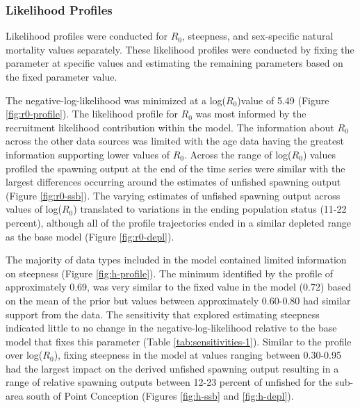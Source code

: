 \documentclass[11pt,
  english,
  letterpaper,
]{article}
\begin{document}
\hypertarget{likelihood-profiles}{%
\subsubsection{Likelihood Profiles}\label{likelihood-profiles}}

Likelihood profiles were conducted for \(R_0\), steepness, and sex-specific natural mortality values separately. These likelihood profiles were conducted by fixing the parameter at specific values and estimating the remaining parameters based on the fixed parameter value.

The negative-log-likelihood was minimized at a log(\(R_0\))value of 5.49 (Figure \ref{fig:r0-profile}). The likelihood profile for \(R_0\) was most informed by the recruitment likelihood contribution within the model. The information about \(R_0\) across the other data sources was limited with the age data having the greatest information supporting lower values of \(R_0\). Across the range of log(\(R_0\)) values profiled the spawning output at the end of the time series were similar with the largest differences occurring around the estimates of unfished spawning output (Figure \ref{fig:r0-ssb}). The varying estimates of unfished spawning output across values of log(\(R_0\)) translated to variations in the ending population status (11-22 percent), although all of the profile trajectories ended in a similar depleted range as the base model (Figure \ref{fig:r0-depl}).

The majority of data types included in the model contained limited information on steepness (Figure \ref{fig:h-profile}). The minimum identified by the profile of approximately 0.69, was very similar to the fixed value in the model (0.72) based on the mean of the prior but values between approximately 0.60-0.80 had similar support from the data. The sensitivity that explored estimating steepness indicated little to no change in the negative-log-likelihood relative to the base model that fixes this parameter (Table \ref{tab:sensitivities-1}). Similar to the profile over log(\(R_0\)), fixing steepness in the model at values ranging between 0.30-0.95 had the largest impact on the derived unfished spawning output resulting in a range of relative spawning outputs between 12-23 percent of unfished for the sub-area south of Point Conception (Figures \ref{fig:h-ssb} and \ref{fig:h-depl}).
\end{document}

